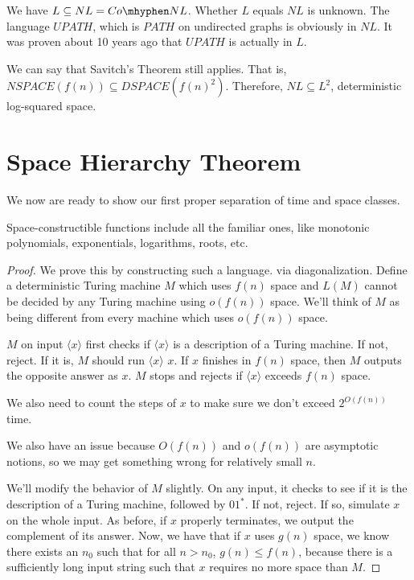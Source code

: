 We have $L\subseteq NL = Co\mhyphen NL$.  Whether $L$ equals $NL$ is unknown.  The language $UPATH$, which is $PATH$ on undirected graphs is obviously in $NL$.  It was proven about 10 years ago that $UPATH$ is actually in $L$.

We can say that Savitch's Theorem still applies.  That is, $NSPACE(f(n)) \subseteq DSPACE(f(n)^2)$. Therefore, $NL\subseteq L^2$, deterministic log-squared space.


\section*{Space Hierarchy Theorem}

We now are ready to show our first proper separation of time and space classes.


Space-constructible functions include all the familiar ones, like monotonic polynomials, exponentials, logarithms, roots, etc.


\begin{proof}
	
	We prove this by constructing such a language. via diagonalization.  Define a deterministic Turing machine $M$ which uses $f(n)$ space and $L(M)$ cannot be decided by any Turing machine using $o(f(n))$ space.  We'll think of $M$ as being different from every machine which uses $o(f(n))$ space.
	
	$M$ on input $\langle x\rangle $ first checks if $\langle x\rangle $ is a description of a Turing machine.  If not, reject.  If it is, $M$ should run $\langle x\rangle$ $x$.  If $x$ finishes in $f(n)$ space, then $M$ outputs the opposite answer as $x$.  $M$ stops and rejects if $\langle x \rangle$ exceeds $f(n)$ space.
	
	We also need to count the steps of $x$ to make sure we don't exceed $2^{O(f(n))}$ time.
	
	We also have an issue because $O(f(n))$ and $o(f(n))$ are asymptotic notions, so we may get something wrong for relatively small $n$.  
	
	We'll modify the behavior of $M$ slightly.  On any input, it checks to see if it is the description of a Turing machine, followed by $01^*$.  If not, reject.  If so, simulate $x$ on the whole input.  As before, if $x$ properly terminates, we output the complement of its answer.  Now, we have that if $x$ uses $g(n)$ space, we know there exists an $n_0$ such that for all $n>n_0$, $g(n)\leq f(n)$, because there is a sufficiently long input string such that $x$ requires no more space than $M$.
	
	
\end{proof}

